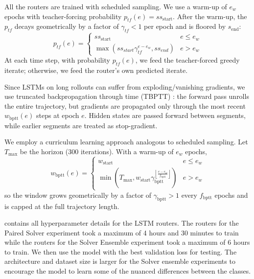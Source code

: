 \documentclass{article}
\begin{document}
All the routers are trained with scheduled sampling. We use a warm-up of $e_{w}$ epochs with teacher-forcing probability $p_{tf}(e) = ss_{\text{start}}$. After the warm-up, the $p_{tf}$ decays geometrically by a factor of $\gamma_{tf} < 1$ per epoch and is floored by $s_{\text{end}}$:
\begin{equation*}
    p_{tf}(e) = \begin{cases}
        ss_{\text{start}} & e \leq e_w\\
        \max(ss_{start}\gamma_{tf}^{e - e_{w}}, ss_{end}) & e > e_w
    \end{cases}
\end{equation*}
At each time step, with probability $p_{tf}(e)$, we feed the teacher-forced greedy iterate; otherwise, we feed the router's own predicted iterate.


Since LSTMs on long rollouts can suffer from exploding/vanishing gradients, we use truncated backpropagation through time (TBPTT) \citep{mozer2013focused,robinson1987utility,werbos1988generalization}: the forward pass unrolls the entire trajectory, but gradients are propagated only through the most recent $w_{\text{bptt}}(e)$ steps at epoch $e$. Hidden states are passed forward between segments, while earlier segments are treated as stop-gradient.

We employ a curriculum learning approach analogous to scheduled sampling. Let $T_{\max}$ be the horizon ($300$ iterations). With a warm-up of $e_w$ epochs,
\begin{equation}
    w_{\text{bptt}}(e)  = 
    \begin{cases}
        w_{\text{start}} & e \leq e_w \\
        \min\left(T_{\max}, w_{\text{start}}\gamma_{\text{bptt}}^{\left\lfloor \frac{e - e_w}{f_{\text{bptt}}}\right\rfloor} \right) & e > e_w
    \end{cases}
\end{equation}
so the window grows geometrically by a factor of $\gamma_{\text{bptt}} > 1$ every $f_{\text{bptt}}$ epochs and is capped at the full trajectory length.

 contains all hyperparameter details for the LSTM routers. The routers for the Paired Solver experiment took a maximum of 4 hours and 30 minutes to train while the routers for the Solver Ensemble experiment took a maximum of 6 hours to train. We then use the model with the best validation loss for testing.  The architecture and dataset size is larger for the Solver ensemble experiments to encourage the model to learn some of the nuanced differences between the classes.
\end{document}
